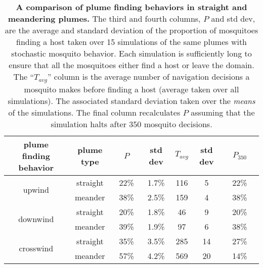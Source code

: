\documentclass[10pt]{article}
\begin{document}
\begin{table}[!htp]
\caption{{\bf A comparison of plume finding behaviors in straight and meandering plumes.} The third and fourth columns, $P$ and std dev, are the average and standard deviation of the proportion of mosquitoes finding a host taken over 15 simulations of the same plumes with stochastic mosquito behavior. Each simulation is sufficiently long to ensure that all the mosquitoes either find a host or leave the domain. The ``$T_{avg}$'' column is the average number of navigation decisions a mosquito makes before finding a host (average taken over all simulations). The associated standard deviation taken over the \textit{means} of the simulations. The final column recalculates $P$ assuming that the simulation halts after 350 mosquito decisions.}
	\begin{center}
		\begin{tabular}{|c|c|c|c|c|c|c|}
			\hline
			plume finding behavior & plume type &$ \quad P \quad $& std dev & $T_{avg}$ & std dev & $\quad P_{350} \quad$\\
			\hline
			\multirow{2}{*}{upwind} & straight &22\% & 1.7\% & 116 & 5 & 22\%\\
										&  meander & 38\% & 2.5\% & 159 & 4 & 38\%\\
										\hline
			\multirow{2}{*}{downwind} & straight &20\% & 1.8\% & 46 & 9 & 20\%\\
										&  meander & 39\% & 1.9\% & 97 & 6 & 38\%\\
										\hline
			\multirow{2}{*}{crosswind} & straight &35\% & 3.5\% & 285 & 14 & 27\%\\
										&  meander & 57\% & 4.2\% & 569 & 20 & 14\%\\
			\hline
		\end{tabular}
		\label{tab:meander}
	\end{center}
\end{table}
\end{document}
